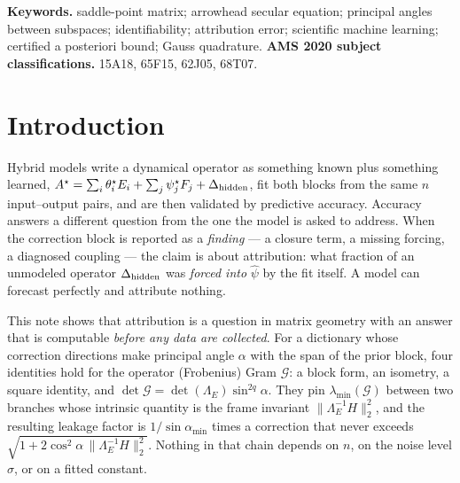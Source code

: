 \documentclass[11pt]{article}
\theoremstyle{remark}
\newcommand{\Gr}{\mathcal{G}}
\newcommand{\Le}{\Lambda_E}
\newcommand{\Cnorm}{\bigl\|\Le^{-1}H\bigr\|_2^2}
\begin{document}
\vspace{2pt}
\noindent\textbf{Keywords.} saddle-point matrix; arrowhead secular equation; principal angles
between subspaces; identifiability; attribution error; scientific machine learning; certified
a posteriori bound; Gauss quadrature.
\quad\textbf{AMS 2020 subject classifications.} 15A18, 65F15, 62J05, 68T07.

\section*{Introduction}

Hybrid models write a dynamical operator as something known plus something learned,
$A^\star=\sum_i\theta_i^\star E_i+\sum_j\psi_j^\star F_j+\Delta_{\rm hidden}$, fit both
blocks from the same $n$ input--output pairs, and are then validated by predictive
accuracy. Accuracy answers a different question from the one the model is asked to
address. When the correction block is reported as a \emph{finding} --- a closure term, a
missing forcing, a diagnosed coupling --- the claim is about attribution: what fraction
of an unmodeled operator $\Delta_{\rm hidden}$ was \emph{forced into} $\hat\psi$ by the
fit itself. A model can forecast perfectly and attribute nothing.

This note shows that attribution is a question in matrix geometry with an answer that is
computable \emph{before any data are collected}. For a dictionary whose correction
directions make principal angle $\alpha$ with the span of the prior block, four
identities hold for the operator (Frobenius) Gram $\Gr$: a block form, an isometry, a
square identity, and $\det\Gr=\det(\Le)\sin^{2q}\alpha$. They pin
$\lambda_{\min}(\Gr)$ between two branches whose intrinsic quantity is the frame
invariant $\Cnorm$, and the resulting leakage factor is $1/\sin\alpha_{\min}$ times a
correction that never exceeds $\sqrt{1+2\cos^2\alpha\,\Cnorm}$. Nothing in that chain
depends on $n$, on the noise level $\sigma$, or on a fitted constant.
\end{document}
